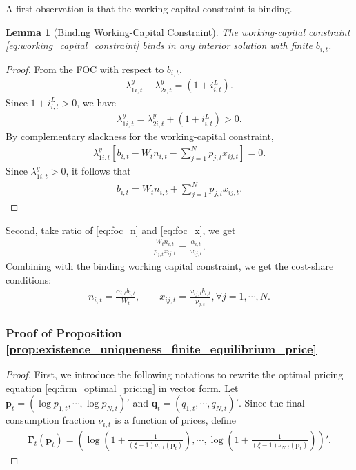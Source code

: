 \documentclass[12pt]{article}
\newtheorem{lemma}{Lemma}[section]
\numberwithin{equation}{section}
\begin{document}
\begin{appendix}
A first observation is that the working capital constraint is binding.

\begin{lemma}[Binding Working-Capital Constraint]\label{lemma:working_capital_binding}
    The working-capital constraint \eqref{eq:working_capital_constraint} binds in any interior solution with finite $b_{i,t}$.
\end{lemma}
\begin{proof}
    From the FOC with respect to $b_{i,t}$,
    \begin{align*}
        \lambda^y_{1i,t} - \lambda^y_{2i,t} = (1+i^L_{i,t}).
    \end{align*}
    Since $1+i^L_{i,t}>0$, we have
    \begin{align*}
        \lambda^y_{1i,t} = \lambda^y_{2i,t} + (1+i^L_{i,t}) > 0.
    \end{align*}
    By complementary slackness for the working-capital constraint,
    \begin{align*}
        \lambda^y_{1i,t}\left[b_{i,t}-W_t n_{i,t}-\sum_{j=1}^N p_{j,t}x_{ij,t}\right]=0.
    \end{align*}
    Since $\lambda^y_{1i,t}>0$, it follows that
    \begin{align*}
        b_{i,t}=W_t n_{i,t}+\sum_{j=1}^N p_{j,t}x_{ij,t}.
    \end{align*}
\end{proof}

Second, take ratio of \eqref{eq:foc_n} and \eqref{eq:foc_x}, we get
\begin{align*}
    \frac{W_t n_{i,t}}{p_{j,t} x_{ij,t}} = \frac{\alpha_{i,t}}{\omega_{ij,t}}.
\end{align*}
Combining with the binding working capital constraint, we get the cost-share conditions:
\begin{align*}
    n_{i,t} = \frac{\alpha_{i,t} b_{i,t}}{W_t}, \qquad x_{ij,t} = \frac{\omega_{ij,t} b_{i,t}}{p_{j,t}}, \forall j = 1, \cdots, N.
\end{align*}



\subsubsection{Proof of Proposition \ref{prop:existence_uniqueness_finite_equilibrium_price}}\label{app:proof_existence_uniqueness_finite_equilibrium_price}
\begin{proof}
    First, we introduce the following notations to rewrite the optimal pricing equation \eqref{eq:firm_optimal_pricing} in vector form. Let $\mathbf{p}_t = (\log p_{1,t}, \cdots, \log p_{N,t})'$ and $\mathbf{q}_t = (q_{1,t}, \cdots, q_{N,t})'$. Since the final consumption fraction $\nu_{i,t}$ is a function of prices, define
    \begin{align*}
        \mathbf{\Gamma}_t(\mathbf{p}_t) = \left(\log \left(1+\frac{1}{(\xi-1)\nu_{1,t}(\mathbf{p}_t)}\right), \cdots, \log \left(1+\frac{1}{(\xi-1)\nu_{N,t}(\mathbf{p}_t)}\right)\right)'.
    \end{align*}
    

\end{proof}
\end{appendix}
\end{document}
